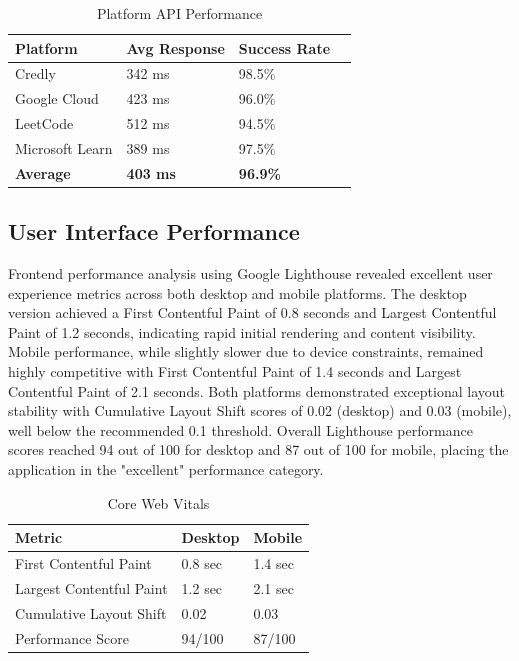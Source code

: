 \documentclass[12pt,a4paper]{article}
\begin{document}
\begin{table}[H]
\centering
\caption{Platform API Performance}
\begin{tabular}{@{}llll@{}}
\toprule
\textbf{Platform} & \textbf{Avg Response} & \textbf{Success Rate} \\
\midrule
Credly & 342 ms & 98.5\% \\
Google Cloud & 423 ms & 96.0\% \\
LeetCode & 512 ms & 94.5\% \\
Microsoft Learn & 389 ms & 97.5\% \\
\midrule
\textbf{Average} & \textbf{403 ms} & \textbf{96.9\%} \\
\bottomrule
\end{tabular}
\end{table}

\subsection{User Interface Performance}

Frontend performance analysis using Google Lighthouse revealed excellent user experience metrics across both desktop and mobile platforms. The desktop version achieved a First Contentful Paint of 0.8 seconds and Largest Contentful Paint of 1.2 seconds, indicating rapid initial rendering and content visibility. Mobile performance, while slightly slower due to device constraints, remained highly competitive with First Contentful Paint of 1.4 seconds and Largest Contentful Paint of 2.1 seconds. Both platforms demonstrated exceptional layout stability with Cumulative Layout Shift scores of 0.02 (desktop) and 0.03 (mobile), well below the recommended 0.1 threshold. Overall Lighthouse performance scores reached 94 out of 100 for desktop and 87 out of 100 for mobile, placing the application in the "excellent" performance category.

\begin{table}[H]
\centering
\caption{Core Web Vitals}
\begin{tabular}{@{}lll@{}}
\toprule
\textbf{Metric} & \textbf{Desktop} & \textbf{Mobile} \\
\midrule
First Contentful Paint & 0.8 sec & 1.4 sec \\
Largest Contentful Paint & 1.2 sec & 2.1 sec \\
Cumulative Layout Shift & 0.02 & 0.03 \\
Performance Score & 94/100 & 87/100 \\
\bottomrule
\end{tabular}
\end{table}
\end{document}
